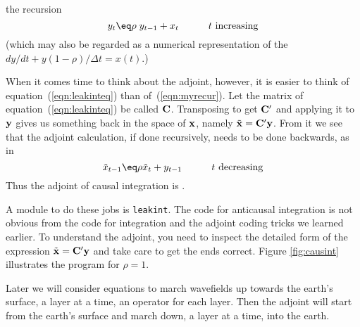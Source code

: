the recursion
\begin{equation}
y_t \eq \rho\; y_{t-1} + x_t
\quad
\quad
\quad t\ {\rm increasing}
\label{eqn:myrecur}
\end{equation}
(which may also be regarded as a numerical representation
of the  $dy/dt+y (1-\rho)/\Delta t=x(t)$.)
\par
When it comes time to think about the adjoint, however,
it is easier to think of equation~(\ref{eqn:leakinteq}) than of~(\ref{eqn:myrecur}).
Let the matrix of equation~(\ref{eqn:leakinteq}) be called $\bold C$.
Transposing to get $\bold C '$ and applying it to $\bold y$
gives us something back in the space of $\bold x$,
namely $\tilde{\bold x} = \bold C' \bold y$.
From it we see that the adjoint calculation,
if done recursively,
needs to be done backwards, as in
\begin{equation}
\tilde x_{t-1} \eq \rho \tilde x_{t} + y_{t-1}
\quad
\quad
\quad t \ {\rm decreasing}
\label{eqn:backrecur}
\end{equation}
Thus the adjoint of causal integration
is .
\par
A module to do these jobs is \texttt{leakint}.
The code for anticausal integration is not obvious
from the code for integration and the adjoint coding tricks we
learned earlier.
To understand the adjoint, you need to inspect
the detailed form of the expression $\tilde{\bold x} = \bold C' \bold y$
and take care to get the ends correct.
Figure \ref{fig:causint} illustrates the program for $\rho = 1$.
\par
\par
Later we will consider equations
to march wavefields up towards the earth's surface,
a layer at a time, an operator for each layer.
Then the adjoint will start from the earth's surface
and march down, a layer at a time, into the earth.

